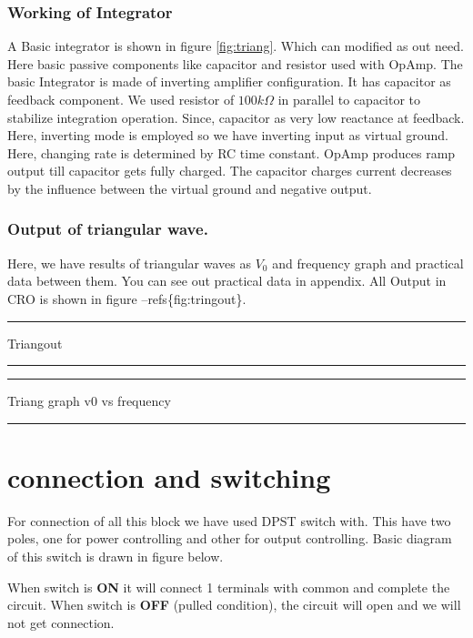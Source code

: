 \documentclass[14pt,a4paper]{extarticle}
\begin{document}
\subsubsection{Working of Integrator}
\label{sec:orgd1e9f0f}

A Basic integrator is shown in figure \ref{fig:triang}. Which can modified as out need. Here basic passive components like capacitor and resistor used with OpAmp. The basic Integrator is made of inverting amplifier configuration. It has capacitor as feedback component. We used resistor of \(100k\Omega\) in parallel to capacitor to stabilize integration operation. Since, capacitor as very low reactance at feedback. Here, inverting mode is employed so we have inverting input as virtual ground. Here, changing rate is determined by RC time constant. OpAmp produces ramp output till capacitor gets fully charged. The capacitor charges current decreases by the influence between the virtual ground and negative output.


\subsubsection{Output of triangular wave.}
\label{sec:org5c5e87f}

Here, we have results of triangular waves as \(V_0\) and frequency graph and practical data between them. You can see out practical data in appendix. All Output in CRO is shown in figure --refs\{fig:tringout\}. 

\noindent\rule{\textwidth}{0.5pt}
Triangout

\noindent\rule{\textwidth}{0.5pt}

\noindent\rule{\textwidth}{0.5pt}
Triang graph v0 vs frequency

\noindent\rule{\textwidth}{0.5pt}

\section{connection and switching}
\label{sec:org5c0b6ec}

For connection of all this block we have used DPST switch with. This have two poles, one for power controlling and other for output controlling. Basic diagram of this switch is drawn in figure below.

When switch is \textbf{\textbf{ON}} it will connect 1 terminals with common and complete the circuit. When switch is \textbf{\textbf{OFF}} (pulled condition), the circuit will open and we will not get connection.
\end{document}
